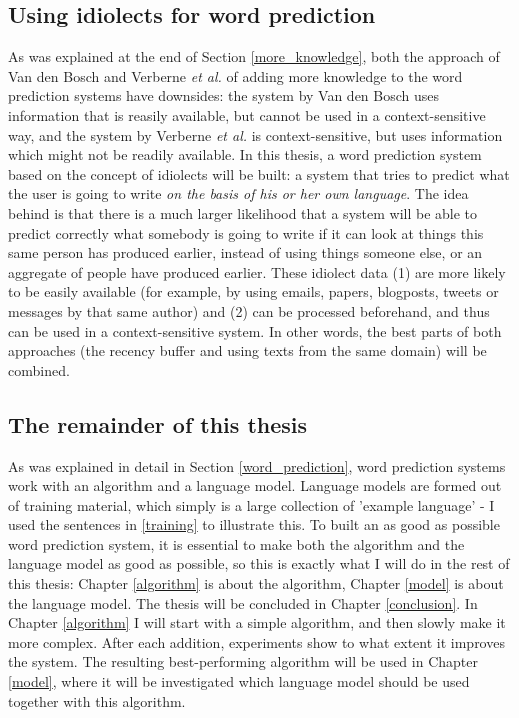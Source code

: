 \documentclass[11pt]{article}
\begin{document}
\subsection{Using idiolects for word prediction} \label{linking}
As was explained at the end of Section \ref{more_knowledge}, both the approach of Van den Bosch  and Verberne {\em et al.}  of adding more knowledge to the word prediction systems have downsides: the system by Van den Bosch  uses information that is reasily available, but cannot be used in a context-sensitive way, and the system by Verberne {\em et al.}  is context-sensitive, but uses information which might not be readily available. In this thesis, a word prediction system based on the concept of idiolects will be built: a system that tries to predict what the user is going to write \emph{on the basis of his  or her own language}. The idea behind is that there is a much larger likelihood that a system will be able to predict correctly what somebody is going to write if it can look at things this same person has produced earlier, instead of using things someone else, or an aggregate of people have produced earlier. These idiolect data (1) are more likely to be easily available (for example, by using emails, papers, blogposts, tweets or messages by that same author) and (2) can be processed beforehand, and thus can be used in a context-sensitive system. In other words, the best parts of both approaches (the recency buffer and using texts from the same domain) will be combined.

\subsection{The remainder of this thesis} \label{restofthisthesis}
As was explained in detail in Section \ref{word_prediction}, word prediction systems work with an algorithm and a language model. Language models are formed out of training material, which simply is a large collection of 'example language' - I used the sentences in \ref{training} to illustrate this. To built an as good as possible word prediction system, it is essential to make both the algorithm and the language model as good as possible, so this is exactly what I will do in the rest of this thesis: Chapter \ref{algorithm} is about the algorithm, Chapter \ref{model} is about the language model. The thesis will be concluded in Chapter \ref{conclusion}. In Chapter \ref{algorithm} I will start with a simple algorithm, and then slowly make it more complex. After each addition, experiments show to what extent it improves the system. The resulting best-performing algorithm will be used in Chapter \ref{model}, where it will be investigated which language model should be used together with this algorithm. 
\end{document}
